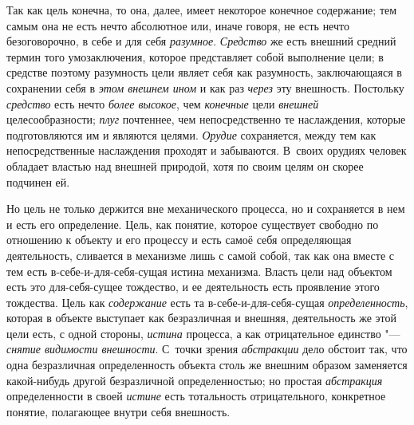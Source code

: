 {{Так как цель конечна, то она, далее, имеет некоторое конечное
содержание; тем самым она не есть нечто абсолютное или, иначе говоря, не
есть нечто безоговорочно, в себе и для себя
{\em разумное}.
{\em Средство} же есть
внешний средний термин того умозаключения, которое представляет собой
выполнение цели; в средстве поэтому разумность цели являет себя как
разумность, заключающаяся в сохранении себя в
{\em этом внешнем ином}
и как раз {\em через}
эту внешность. Постольку
{\em средство} есть нечто
{\em более высокое}, чем
{\em конечные} цели
{\em внешней}
целесообразности;
{\em плуг} почтеннее, чем
непосредственно те наслаждения, которые подготовляются им и являются
целями. {\em Орудие}
сохраняется, между тем как непосредственные наслаждения
проходят и забываются. В~своих орудиях человек обладает властью над внешней
природой, хотя по своим целям он скорее подчинен ей.

Но цель не только держится вне механического процесса, но и
сохраняется в нем и есть его определение. Цель, как понятие, которое
существует свободно по отношению к объекту и его процессу и есть самоё себя
определяющая деятельность, сливается в механизме лишь с самой собой, так
как она вместе с тем есть в-себе-и-для-себя-сущая истина механизма. Власть
цели над объектом есть это для-себя-сущее тождество, и ее деятельность есть
проявление этого тождества. Цель как
{\em содержание} есть та
в-себе-и-для-себя-сущая
{\em определенность},
которая в объекте выступает как безразличная и внешняя,
деятельность же этой цели есть, с одной стороны,
{\em истина} процесса, а
как отрицательное единство "--- {\em снятие
видимости внешности}. С~точки зрения
{\em абстракции} дело
обстоит так, что одна безразличная определенность объекта столь же внешним
образом заменяется какой-нибудь другой безразличной определенностью; но
простая {\em абстракция}
определенности в своей
{\em истине} есть
тотальность отрицательного, конкретное понятие, полагающее внутри себя
внешность.

}}

